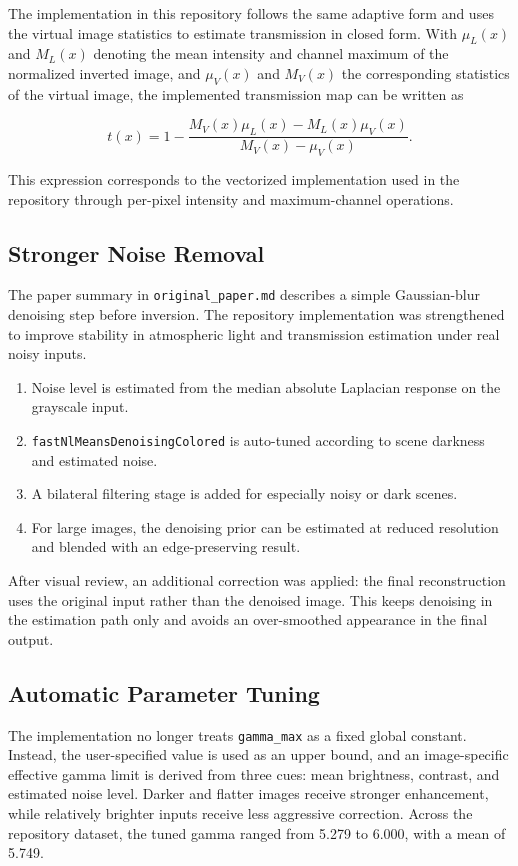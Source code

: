 \documentclass[conference]{IEEEtran}
\begin{document}
The implementation in this repository follows the same adaptive form and uses the virtual image statistics to estimate transmission in closed form. With $\mu_L(x)$ and $M_L(x)$ denoting the mean intensity and channel maximum of the normalized inverted image, and $\mu_V(x)$ and $M_V(x)$ the corresponding statistics of the virtual image, the implemented transmission map can be written as

\begin{equation}
t(x) = 1 - \frac{M_V(x)\mu_L(x) - M_L(x)\mu_V(x)}{M_V(x) - \mu_V(x)}.
\label{eq:implemented_t}
\end{equation}

This expression corresponds to the vectorized implementation used in the repository through per-pixel intensity and maximum-channel operations.

\subsection{Stronger Noise Removal}
The paper summary in \texttt{original\_paper.md} describes a simple Gaussian-blur denoising step before inversion. The repository implementation was strengthened to improve stability in atmospheric light and transmission estimation under real noisy inputs.

\begin{enumerate}
\item Noise level is estimated from the median absolute Laplacian response on the grayscale input.
\item \texttt{fastNlMeansDenoisingColored} is auto-tuned according to scene darkness and estimated noise.
\item A bilateral filtering stage is added for especially noisy or dark scenes.
\item For large images, the denoising prior can be estimated at reduced resolution and blended with an edge-preserving result.
\end{enumerate}

After visual review, an additional correction was applied: the final reconstruction uses the original input rather than the denoised image. This keeps denoising in the estimation path only and avoids an over-smoothed appearance in the final output.

\subsection{Automatic Parameter Tuning}
The implementation no longer treats \texttt{gamma\_max} as a fixed global constant. Instead, the user-specified value is used as an upper bound, and an image-specific effective gamma limit is derived from three cues: mean brightness, contrast, and estimated noise level. Darker and flatter images receive stronger enhancement, while relatively brighter inputs receive less aggressive correction. Across the repository dataset, the tuned gamma ranged from 5.279 to 6.000, with a mean of 5.749.
\end{document}
